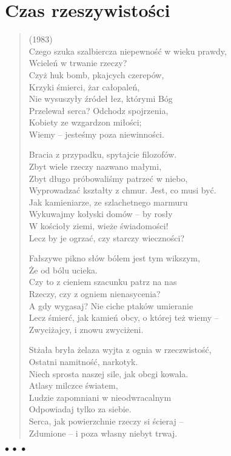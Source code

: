 \documentclass{article} %
\newenvironment{wierszd}[2]
	{\begin{verse} \hspace*{-1em}{\bf #1}\hfill{\small{(#2)}}\\[.5ex] }
	{\end{verse} \begin{center}$\bullet\ \bullet\ \bullet$\end{center}}
\newcommand{\chap}[1]{\newpage\section*{#1}}
\newcommand{\e}{\eob}
\renewcommand{\a}{\aob}
\renewcommand{\o}{\'{o}}
\newcommand{\z}{\'{z}}
\newcommand{\n}{\'{n}}
\newcommand{\s}{\'{s}}
\newcommand{\ci}{\'{c}}
\begin{document}
\chap{Czas rzeszywisto{\s}ci} 
%
\begin{wierszd} {Powierzchnie rzeczy}{1983}
Czego szuka szalbiercza niepewno{\s}{\ci} w wieku prawdy,\\
Wciele{\n} w trwanie rzeczy? \\
Czy\.{z} huk bomb, p{\e}kaj{\a}cych czerep{\o}w, \\
Krzyki {\s}mierci, \.{z}ar ca{\l}opale{\n}, \\
Nie wysuszy{\l}y {\z}r{\o}de{\l} {\l}ez, kt{\o}rymi B{\o}g \\
Przelewa{\l} serca? Odchodz{\a} spojrzenia, \\
Kobiety ze wzgardzon{\a} mi{\l}o{\s}ci{\a}; \\
Wiemy -- jeste{\s}my poza niewinno{\s}ci{\a}. 

Bracia z przypadku, spytajcie filozof{\o}w. \\
Zbyt wiele rzeczy nazwano ma{\l}ymi,  \\
Zbyt d{\l}ugo pr{\o}bowali{\s}my patrze{\ci} w niebo, \\
Wyprowadza{\ci} kszta{\l}ty z chmur. Jest, co musi by{\ci}. \\
Jak kamieniarze, ze szlachetnego marmuru \\
Wykuwajmy ko{\l}yski dom{\o}w -- by ros{\l}y \\
W ko{\s}cio{\l}y ziemi, wie\.{z}e {\s}wiadomo{\s}ci! \\
Lecz by je ogrza{\ci}, czy starczy wieczno{\s}ci? 

Fa{\l}szywe pi{\e}kno s{\l}{\o}w b{\o}lem jest tym wi{\e}kszym, \\
\.{Z}e od b{\o}lu ucieka. \\
Czy to z cieniem szacunku patrz{\a} na nas \\
Rzeczy, czy z ogniem nienasycenia?\\
A gdy wygasaj{\a}? Nie ciche ptak{\o}w umieranie \\
Lecz {\s}mier{\ci}, jak kamie{\n} obcy, o kt{\o}rej te\.{z} wiemy -- \\
Zwyci{\e}\.{z}aj{\a}cy, i znowu zwyci{\e}\.{z}eni. 

St{\e}\.{z}a{\l}a bry{\l}a \.{z}elaza wyj{\e}ta z ognia w rzeczwisto{\s}{\ci}, \\
Ostatni{\a} nami{\e}tno{\s}{\ci}, narkotyk. \\
Niech sprosta naszej sile, jak obc{\e}gi kowala.  \\
Atlasy milcz{\a}ce {\s}wiatem, \\
Ludzie zapomniani w nieodwracalnym \\
Odpowiadaj{\a} tylko za siebie. \\
Serca, jak powierzchnie rzeczy si{\e} {\s}cieraj{\a} -- \\
Zdumione -- i poza w{\l}asny niebyt trwaj{\a}. 
\vspace*{-1ex}\end{wierszd}\vspace*{-3ex}
%
\end{document}
